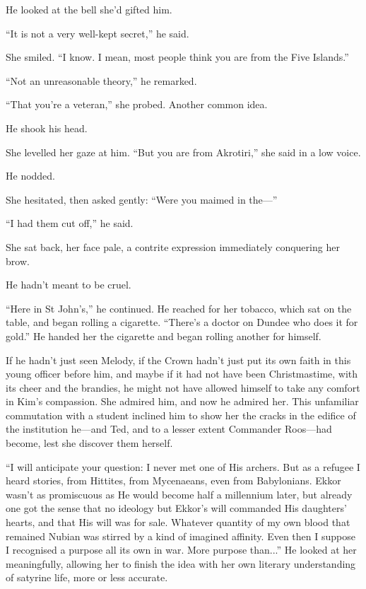 \documentclass[11pt,a5paper]{article}
\begin{document}
He looked at the bell she'd gifted him.

``It is not a very well-kept secret,'' he said.

She smiled. ``I know. I mean, most people think you are from the Five Islands.''

``Not an unreasonable theory,'' he remarked.

``That you're a veteran,'' she probed. Another common idea.

He shook his head.

She levelled her gaze at him. ``But you are from Akrotiri,'' she said in a low voice.

He nodded.

She hesitated, then asked gently: ``Were you maimed in the---''

``I had them cut off,'' he said.

She sat back, her face pale, a contrite expression immediately conquering her brow.

He hadn't meant to be cruel.

``Here in St John's,'' he continued. He reached for her tobacco, which sat on the table, and began rolling a cigarette. ``There's a doctor on Dundee who does it for gold.'' He handed her the cigarette and began rolling another for himself.

If he hadn't just seen Melody, if the Crown hadn't just put its own faith in this young officer before him, and maybe if it had not have been Christmastime, with its cheer and the brandies, he might not have allowed himself to take any comfort in Kim's compassion. She admired him, and now he admired her. This unfamiliar commutation with a student inclined him to show her the cracks in the edifice of the institution he---and Ted, and to a lesser extent Commander Roos---had become, lest she discover them herself.

``I will anticipate your question: I never met one of His archers. But as a refugee I heard stories, from Hittites, from Mycenaeans, even from Babylonians. Ekkor wasn't as promiscuous as He would become half a millennium later, but already one got the sense that no ideology but Ekkor's will commanded His daughters' hearts, and that His will was for sale. Whatever quantity of my own blood that remained Nubian was stirred by a kind of imagined affinity. Even then I suppose I recognised a purpose all its own in war. More purpose than...'' He looked at her meaningfully, allowing her to finish the idea with her own literary understanding of satyrine life, more or less accurate.
\end{document}
